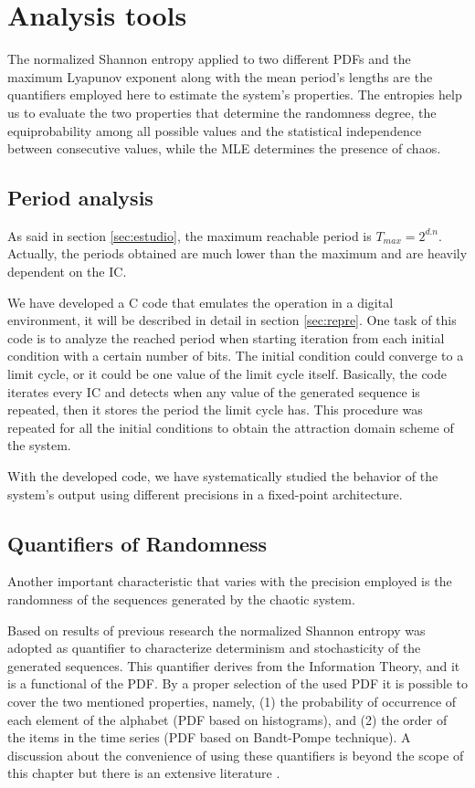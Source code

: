\section{Analysis tools}
\label{sec:quanti}

The normalized Shannon entropy applied to two different PDFs and the maximum Lyapunov exponent along with the mean period's lengths are the quantifiers employed here to estimate the system's properties. The entropies   help us to evaluate the two properties that determine the randomness degree, the equiprobability among all possible values and the statistical independence between consecutive values, while the MLE determines the presence of chaos. 
 
\subsection{Period analysis}

As said in section \ref{sec:estudio}, the maximum reachable period is $T_{max}=2^{d.n}$. Actually, the periods obtained are much lower than the maximum and are heavily dependent on the IC.

We have developed a C code that emulates the operation in a digital environment, it will be described in detail in section \ref{sec:repre}. One task of this code is to analyze the reached period when starting iteration from each initial condition with a certain number of bits. The initial condition could converge to a limit cycle, or it could be one value of the limit cycle itself. Basically, the code iterates every IC and detects when any value of the generated sequence is repeated, then it stores the period the limit cycle has.
This procedure was repeated for all the initial
conditions to obtain the attraction domain scheme of the
system.


With the developed code, we have systematically studied the behavior of the system's output
using different precisions in a fixed-point architecture.\subsection{Quantifiers of Randomness}
\label{cu_ran}

Another important characteristic that varies with the precision employed is the randomness of the sequences generated by the chaotic system. 

Based on results of previous research \cite{DeMicco2008,Antonelli2016,DeMicco2011} the normalized Shannon entropy was adopted as quantifier to characterize determinism and stochasticity of the generated sequences. This quantifier derives from the Information Theory, and it is a functional of the PDF. By a proper selection of the used PDF it is possible to cover the two mentioned properties, namely, (1) the probability of occurrence of each element of the alphabet (PDF based on histograms), and (2) the order of the items in the time series (PDF based on Bandt-Pompe technique).
A discussion about the convenience of using these quantifiers is beyond the scope of this chapter but there is an extensive literature \cite{Rosso2007A,DeMicco2008,Martin2006}.

